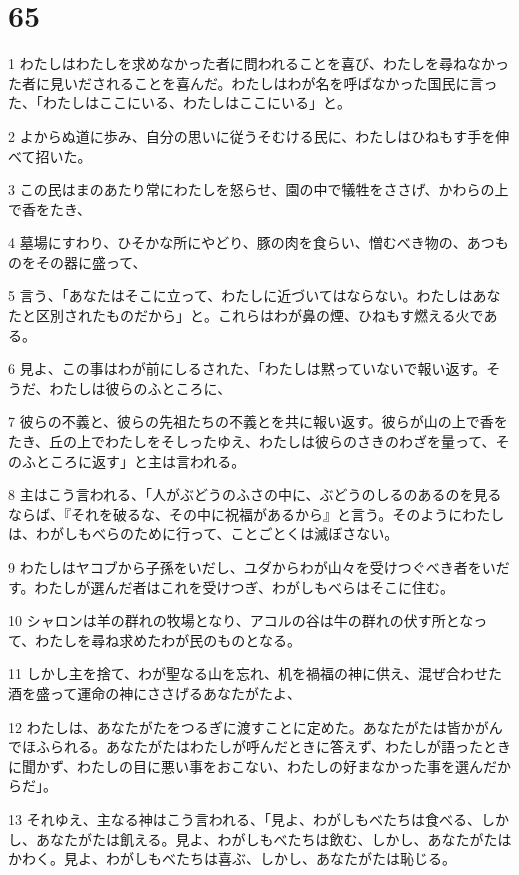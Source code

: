 \chapter{65}

\par 1 わたしはわたしを求めなかった者に問われることを喜び、わたしを尋ねなかった者に見いだされることを喜んだ。わたしはわが名を呼ばなかった国民に言った、「わたしはここにいる、わたしはここにいる」と。
\par 2 よからぬ道に歩み、自分の思いに従うそむける民に、わたしはひねもす手を伸べて招いた。
\par 3 この民はまのあたり常にわたしを怒らせ、園の中で犠牲をささげ、かわらの上で香をたき、
\par 4 墓場にすわり、ひそかな所にやどり、豚の肉を食らい、憎むべき物の、あつものをその器に盛って、
\par 5 言う、「あなたはそこに立って、わたしに近づいてはならない。わたしはあなたと区別されたものだから」と。これらはわが鼻の煙、ひねもす燃える火である。
\par 6 見よ、この事はわが前にしるされた、「わたしは黙っていないで報い返す。そうだ、わたしは彼らのふところに、
\par 7 彼らの不義と、彼らの先祖たちの不義とを共に報い返す。彼らが山の上で香をたき、丘の上でわたしをそしったゆえ、わたしは彼らのさきのわざを量って、そのふところに返す」と主は言われる。
\par 8 主はこう言われる、「人がぶどうのふさの中に、ぶどうのしるのあるのを見るならば、『それを破るな、その中に祝福があるから』と言う。そのようにわたしは、わがしもべらのために行って、ことごとくは滅ぼさない。
\par 9 わたしはヤコブから子孫をいだし、ユダからわが山々を受けつぐべき者をいだす。わたしが選んだ者はこれを受けつぎ、わがしもべらはそこに住む。
\par 10 シャロンは羊の群れの牧場となり、アコルの谷は牛の群れの伏す所となって、わたしを尋ね求めたわが民のものとなる。
\par 11 しかし主を捨て、わが聖なる山を忘れ、机を禍福の神に供え、混ぜ合わせた酒を盛って運命の神にささげるあなたがたよ、
\par 12 わたしは、あなたがたをつるぎに渡すことに定めた。あなたがたは皆かがんでほふられる。あなたがたはわたしが呼んだときに答えず、わたしが語ったときに聞かず、わたしの目に悪い事をおこない、わたしの好まなかった事を選んだからだ」。
\par 13 それゆえ、主なる神はこう言われる、「見よ、わがしもべたちは食べる、しかし、あなたがたは飢える。見よ、わがしもべたちは飲む、しかし、あなたがたはかわく。見よ、わがしもべたちは喜ぶ、しかし、あなたがたは恥じる。
